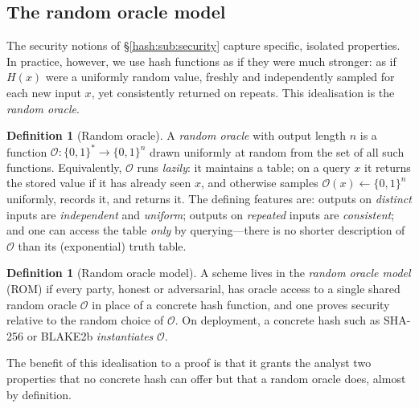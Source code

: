 \documentclass[11pt,a4paper]{article}
\theoremstyle{definition}
\newtheorem{definition}[theorem]{Definition}
\theoremstyle{remark}
\begin{document}
\subsection{The random oracle model}\label{hash:sub:rom}

The security notions of \S\ref{hash:sub:security} capture specific, isolated properties. In practice, however, we use hash functions as if they were much stronger: as if \(H(x)\) were a uniformly random value, freshly and independently sampled for each new input \(x\), yet consistently returned on repeats. This idealisation is the \emph{random oracle}.

\begin{definition}[Random oracle]\label{hash:def:ro}
A \emph{random oracle} with output length \(n\) is a function \(\mathcal{O} \colon \{0,1\}^{*} \to \{0,1\}^{n}\) drawn uniformly at random from the set of all such functions. Equivalently, \(\mathcal{O}\) runs \emph{lazily}: it maintains a table; on a query \(x\) it returns the stored value if it has already seen \(x\), and otherwise samples \(\mathcal{O}(x) \leftarrow \{0,1\}^{n}\) uniformly, records it, and returns it. The defining features are: outputs on \emph{distinct} inputs are \emph{independent} and \emph{uniform}; outputs on \emph{repeated} inputs are \emph{consistent}; and one can access the table \emph{only} by querying---there is no shorter description of \(\mathcal{O}\) than its (exponential) truth table.
\end{definition}

\begin{definition}[Random oracle model]\label{hash:def:rom}
A scheme lives in the \emph{random oracle model} (ROM) if every party, honest or adversarial, has oracle access to a single shared random oracle \(\mathcal{O}\) in place of a concrete hash function, and one proves security relative to the random choice of \(\mathcal{O}\). On deployment, a concrete hash such as SHA-256 or BLAKE2b \emph{instantiates} \(\mathcal{O}\).
\end{definition}

The benefit of this idealisation to a proof is that it grants the analyst two properties that no concrete hash can offer but that a random oracle does, almost by definition.
\end{document}
